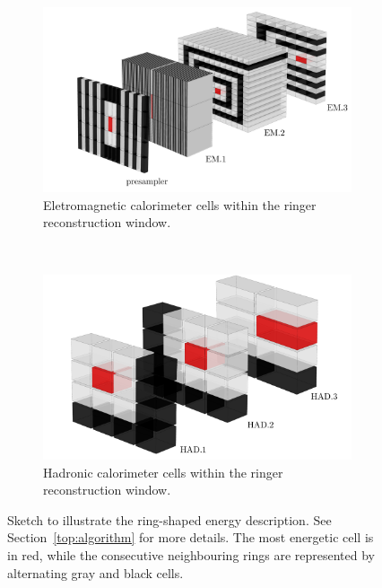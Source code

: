 \begin{figure}[h!t]
	\centering
	\begin{center}
		\begin{subfigure}[c]{0.8\textwidth}
			\centering
			\includegraphics[width=\textwidth]{sections/02_context/figures/ATLAS_EM_Layers_v5.pdf}
			\caption{Eletromagnetic calorimeter cells within the ringer reconstruction window.}
		\end{subfigure} \\
		\begin{subfigure}[c]{0.8\textwidth}
			\centering
			\includegraphics[width=\textwidth]{sections/02_context/figures/ATLAS_HAD_Layers_v5.pdf}
			\caption{Hadronic calorimeter cells within the ringer reconstruction window.}
		\end{subfigure}
	\end{center}
	\caption{\label{fig:calo_rings}
		Sketch to illustrate the ring-shaped energy description. See
		Section~\ref{top:algorithm} for more details. 
		The most energetic cell is in red, while the consecutive neighbouring rings are represented by alternating gray and black cells.
	}
\end{figure}


